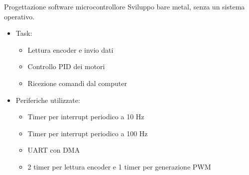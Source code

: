 \documentclass{beamer}
\begin{document}

\begin{tframe}{Progettazione software microcontrollore}
Sviluppo bare metal, senza un sistema operativo.
\begin{itemize}
    \item Task:
        \begin{itemize}
            \item Lettura encoder e invio dati
            \item Controllo PID dei motori
            \item Ricezione comandi dal computer
        \end{itemize}
    \item Periferiche utilizzate:
        \begin{itemize}
            \item Timer per interrupt periodico a 10 Hz
            \item Timer per interrupt periodico a 100 Hz
            \item UART con DMA
            \item 2 timer per lettura encoder e 1 timer per generazione PWM
        \end{itemize}
\end{itemize}

\end{tframe}
\end{document}
